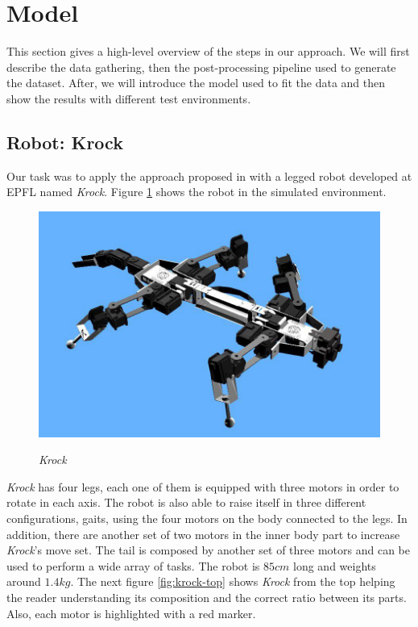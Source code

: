 \documentclass[../document.tex]{subfiles}
\begin{document}
\section{Model}
This section gives a high-level overview of the steps in our approach. We will first describe the data gathering,  then the post-processing pipeline used to generate the dataset. After, we will introduce the model used to fit the data and then show the results with different test environments.
\subsection{Robot: Krock}
Our task was to apply the approach proposed in \cite{omar@traversability} with a legged robot developed at EPFL named 
\emph{Krock}. Figure \ref{fig:krock} shows the robot in the simulated environment.
\begin{figure}[H]
    \centering
    \includegraphics[width=0.5\linewidth]{img/krock-1.jpg}
    \label{fig:krock}
    \caption{\emph{Krock}}
\end{figure}
\emph{Krock} has four legs, each one of them is equipped with three motors in order to rotate in each axis. The robot is also able to raise itself in three different configurations, gaits, using the four motors on the body connected to the legs. In addition, there are another set of two motors in the inner body part to increase \emph{Krock}'s move set. 
The tail is composed by another set of three motors and can be used to perform a wide array of tasks.
The robot is $85cm$ long and weights around $1.4kg$. The next figure \ref{fig:krock-top} shows \emph{Krock} from the top helping the reader understanding its composition and the correct ratio between its parts. Also, each motor is highlighted with a red marker.
\end{document}
